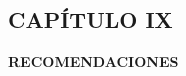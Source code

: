 \begin{center}
    \section*{CAPÍTULO IX}
    \vspace*{0.5in}
    \textbf{RECOMENDACIONES}
\end{center}

\newpage